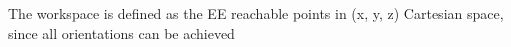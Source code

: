 \documentclass[preview]{standalone}
\begin{document}
\begin{center}
The workspace is defined as the EE reachable points in (x, y, z) Cartesian space, since all orientations can be achieved
\end{center}
\end{document}

